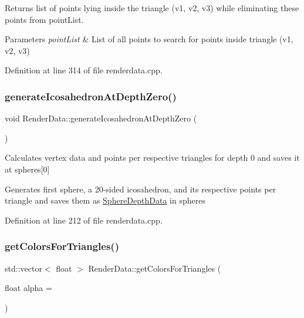 \begin{DoxyReturn}{Returns}
list of points lying \textquotesingle{}inside\textquotesingle{} the triangle (v1, v2, v3) while eliminating these points from point\+List. 
\end{DoxyReturn}

\begin{DoxyParams}{Parameters}
{\em point\+List} & List of all points to search for points \textquotesingle{}inside\textquotesingle{} triangle (v1, v2, v3) \\
\hline
\end{DoxyParams}


Definition at line 314 of file renderdata.\+cpp.

\mbox{\label{class_render_data_adee024bdbedaae2cfd38bb2038b4aa48}} 
\subsubsection{\texorpdfstring{generate\+Icosahedron\+At\+Depth\+Zero()}{generateIcosahedronAtDepthZero()}}
{\footnotesize\ttfamily void Render\+Data\+::generate\+Icosahedron\+At\+Depth\+Zero (\begin{DoxyParamCaption}{ }\end{DoxyParamCaption})\hspace{0.3cm}{\ttfamily [private]}}

Calculates vertex data and points per respective triangles for depth 0 and saves it at spheres\mbox{[}0\mbox{]}

Generates first \textquotesingle{}sphere\textquotesingle{}, a 20-\/sided icosahedron, and its respective points per triangle and saves them as \hyperlink{struct_sphere_depth_data}{Sphere\+Depth\+Data} in spheres 

Definition at line 212 of file renderdata.\+cpp.

\mbox{\label{class_render_data_a58fe3351334cd518b930dfe0a0aa8732}} 
\subsubsection{\texorpdfstring{get\+Colors\+For\+Triangles()}{getColorsForTriangles()}}
{\footnotesize\ttfamily std\+::vector$<$ float $>$ Render\+Data\+::get\+Colors\+For\+Triangles (\begin{DoxyParamCaption}\item[{float}]{alpha = {} }\end{DoxyParamCaption})}

